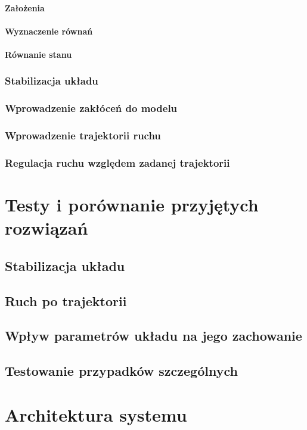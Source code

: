 \documentclass[12pt, oneside]{report}
\theoremstyle{definition}
\begin{document}
\subsubsection{Założenia}
\subsubsection{Wyznaczenie równań}
\subsubsection{Równanie stanu}
\subsection{Stabilizacja układu}
\subsection{Wprowadzenie zakłóceń do modelu}
\subsection{Wprowadzenie trajektorii ruchu}
\subsection{Regulacja ruchu względem zadanej trajektorii}


\chapter{Testy i porównanie przyjętych rozwiązań}
\section{Stabilizacja układu}
\section{Ruch po trajektorii}
\section{Wpływ parametrów układu na jego zachowanie}
\section{Testowanie przypadków szczególnych}


\chapter{Architektura systemu}
\end{document}
